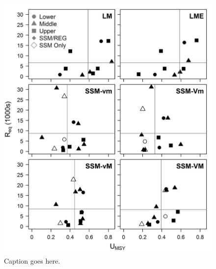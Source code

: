\documentclass[12pt,]{book}
\theoremstyle{definition}
\theoremstyle{definition}
\theoremstyle{definition}
\theoremstyle{remark}
\begin{document}
\clearpage

\begin{figure}
  \centering
  \includegraphics{img/Ch4/Size-v-Prod.jpg}
  \caption{Caption goes here.}
  \label{fig:size-v-prod}
\end{figure}

\clearpage
\end{document}

